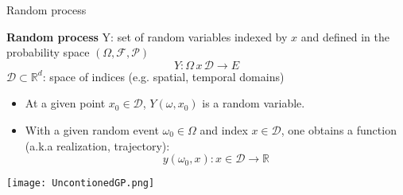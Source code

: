 \documentclass[9pt]{beamer}
\begin{document}
%
%
%
%
%
%
%

\begin{frame}[t]{Random process}

{\bf Random process} Y: set of random variables indexed by $x$ and defined in the probability space $(\Omega, \mathcal{F}, \mathcal{P})$
\[
Y: \Omega \, x \, \mathcal{D} \to E
\]
$\mathcal{D} \subset \mathbb{R}^d$: space of indices (e.g. spatial, temporal domains)

\begin{itemize}
\item At a given point $x_0 \in \mathcal{D}$, $Y(\omega, x_0)$ is a random variable.
\item With a given random event $\omega_0 \in \Omega$ and index $x \in \mathcal{D}$, one obtains a function (a.k.a realization, trajectory):
\[
y(\omega_0, x): x \in \mathcal{D}  \to \mathbb{R} 
\]
\end{itemize}

\vspace{-10pt}
\begin{center}
\texttt{[image: UncontionedGP.png]}
\end{center}

\end{frame}
\end{document}
